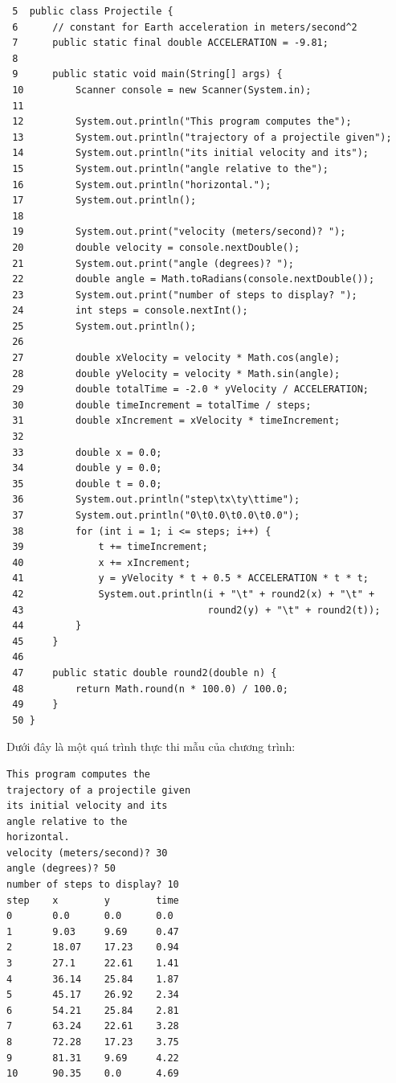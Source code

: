 \begin{verbatim}
 5  public class Projectile {
 6      // constant for Earth acceleration in meters/second^2
 7      public static final double ACCELERATION = -9.81;
 8
 9      public static void main(String[] args) {
 10         Scanner console = new Scanner(System.in);
 11
 12         System.out.println("This program computes the");
 13         System.out.println("trajectory of a projectile given");
 14         System.out.println("its initial velocity and its");
 15         System.out.println("angle relative to the");
 16         System.out.println("horizontal.");
 17         System.out.println();
 18
 19         System.out.print("velocity (meters/second)? ");
 20         double velocity = console.nextDouble();
 21         System.out.print("angle (degrees)? ");
 22         double angle = Math.toRadians(console.nextDouble());
 23         System.out.print("number of steps to display? ");
 24         int steps = console.nextInt();
 25         System.out.println();
 26
 27         double xVelocity = velocity * Math.cos(angle);
 28         double yVelocity = velocity * Math.sin(angle);
 29         double totalTime = -2.0 * yVelocity / ACCELERATION;
 30         double timeIncrement = totalTime / steps;
 31         double xIncrement = xVelocity * timeIncrement;
 32
 33         double x = 0.0;
 34         double y = 0.0;
 35         double t = 0.0;
 36         System.out.println("step\tx\ty\ttime");
 37         System.out.println("0\t0.0\t0.0\t0.0");
 38         for (int i = 1; i <= steps; i++) {
 39             t += timeIncrement;
 40             x += xIncrement;
 41             y = yVelocity * t + 0.5 * ACCELERATION * t * t;
 42             System.out.println(i + "\t" + round2(x) + "\t" +
 43                                round2(y) + "\t" + round2(t));
 44         }
 45     }
 46
 47     public static double round2(double n) {
 48         return Math.round(n * 100.0) / 100.0;
 49     }
 50 }
\end{verbatim}

Dưới đây là một quá trình thực thi mẫu của chương trình:

\begin{verbatim}
This program computes the 
trajectory of a projectile given 
its initial velocity and its 
angle relative to the 
horizontal. 
velocity (meters/second)? 30  
angle (degrees)? 50  
number of steps to display? 10  
step    x        y        time 
0       0.0      0.0      0.0 
1       9.03     9.69     0.47 
2       18.07    17.23    0.94 
3       27.1     22.61    1.41 
4       36.14    25.84    1.87 
5       45.17    26.92    2.34 
6       54.21    25.84    2.81 
7       63.24    22.61    3.28 
8       72.28    17.23    3.75 
9       81.31    9.69     4.22 
10      90.35    0.0      4.69
\end{verbatim}

